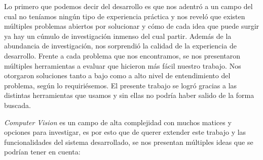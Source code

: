\documentclass[a4paper]{article}
\begin{document}
Lo primero que podemos decir del desarrollo es que nos adentró a un campo del cual no teníamos ningún tipo de experiencia práctica y nos reveló que existen múltiples problemas abiertos por solucionar y cómo de cada idea que puede surgir ya hay un cúmulo de investigación inmenso del cual partir.
Además de la abundancia de investigación, nos sorprendió la calidad de la experiencia de desarrollo. Frente a cada problema que nos encontramos, se nos presentaron múltiples herramientas a evaluar que hicieron más fácil nuestro trabajo. Nos otorgaron soluciones tanto a bajo como a alto nivel de entendimiento del problema, según lo requiriésemos. El presente trabajo se logró gracias a las distintas herramientas que usamos y sin ellas no podría haber salido de la forma buscada. \medskip

\textit{Computer Vision} es un campo de alta complejidad con muchos matices y opciones para investigar, es por esto que de querer extender este trabajo y las funcionalidades del sistema desarrollado, se nos presentan múltiples ideas que se podrían tener en cuenta:
\end{document}
